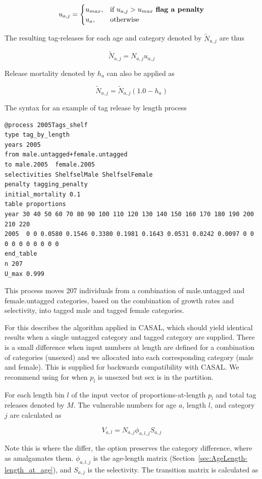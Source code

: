 $$
u_{a,j} =
\begin{cases}
u_{max},& \text{if } u_{a,j} > u_{max} \text{ \textbf{flag a penalty}}\\
u_{a},  & \text{otherwise}
\end{cases}
$$

The resulting tag-releases for each age and category denoted by \(\widetilde{N}_{a,j}\) are thus

$$
\widetilde{N}_{a,j} = N_{a,j} u_{a,j}
$$

Release mortality denoted by \(h_a\) can also be applied as

$$\widetilde{N}_{a,j} = \widetilde{N}_{a,j}\left(1.0 - h_a\right)$$

The syntax for an example of tag release by length process

{\small{\begin{verbatim}
@process 2005Tags_shelf
type tag_by_length
years 2005
from male.untagged+female.untagged
to male.2005  female.2005
selectivities ShelfselMale ShelfselFemale
penalty tagging_penalty
initial_mortality 0.1
table proportions
year 30 40 50 60 70 80 90 100 110 120 130 140 150 160 170 180 190 200 210 220
2005  0 0 0.0580 0.1546 0.3380 0.1981 0.1643 0.0531 0.0242 0.0097 0 0 0 0 0 0 0 0 0 0
end_table
n 207
U_max 0.999
\end{verbatim}}}

This process moves 207 individuals from a combination of male.untagged and female.untagged categories, based on the combination of growth rates and selectivity, into tagged male and tagged female categories.

For  
this describes the algorithm applied in CASAL, which should yield identical results when a single untagged category and tagged category are supplied. There is a small difference when input numbers at length are defined for a combination of categories (unsexed) and we allocated into each corresponding category (male and female). This is supplied for backwards compatibility with CASAL. We recommend using  for when ${p}_l$ is unsexed but sex is in the partition.

For each length bin $l$ of the input vector of proportions-at-length ${p}_l$ and total tag releases denoted by \(M\). The vulnerable numbers for age \(a\), length \(l\), and category \(j\) are calculated as

$$V_{a,l} = N_{a,j} \phi_{a,l,j} S_{a,j}$$

Note this is where the  differ, the  option preserves the category difference, where as  amalgamates them. \(\phi_{a,l,j}\) is the age-length matrix (Section~\ref{sec:AgeLength-length_at_age}), and \(S_{a,j}\) is the selectivity. The transition matrix is calculated as

